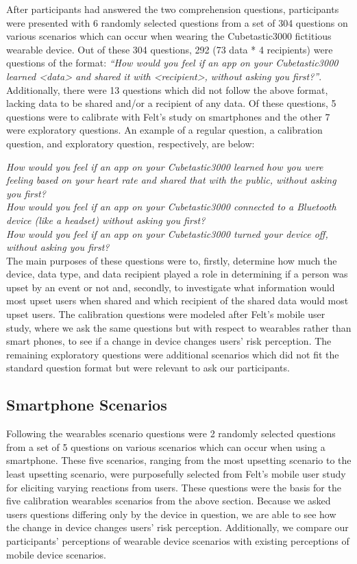 \documentclass{acm_proc_article-sp}
\begin{document}
After participants had answered the two comprehension questions, participants were presented with 6 randomly selected questions from a set of 304 questions on various scenarios which can occur when wearing the Cubetastic3000 fictitious wearable device. Out of these 304 questions, 292 (73 data * 4 recipients) were questions of the format: \textit{``How would you feel if an app on your Cubetastic3000 learned <data> and shared it with <recipient>, without asking you first?''}. Additionally, there were 13 questions which did not follow the above format, lacking data to be shared and/or a recipient of any data. Of these questions, 5 questions were to calibrate with Felt's study on smartphones and the other 7  were exploratory questions. An example of a regular question, a calibration question, and exploratory question, respectively, are below:  

\textit{How would you feel if an app on your Cubetastic3000 learned how you were feeling based on your heart rate and shared that with the public, without asking you first?}\\[-.5cm]

\textit{How would you feel if an app on your Cubetastic3000 connected to a Bluetooth device (like a headset) without asking you first?} \\[-.5cm]

\textit{How would you feel if an app on your Cubetastic3000 turned your device off, without asking you first?}\\[-.5cm]

The main purposes of these questions were to, firstly, determine how much the device, data type, and data recipient played a role in determining if a person was upset by an event or not and, secondly, to investigate what information would most upset users when shared and which recipient of the shared data would most upset users. The calibration questions were modeled after Felt's mobile user study, where we ask the same questions but with respect to wearables rather than smart phones, to see if a change in device changes users' risk perception. The remaining exploratory questions were additional scenarios which did not fit the standard question format but were relevant to ask our participants. 

\subsection{Smartphone Scenarios}
Following the wearables scenario questions were 2 randomly selected questions from a set of 5 questions on various scenarios which can occur when using a smartphone. These five scenarios, ranging from the most upsetting scenario to the least upsetting scenario, were purposefully selected from Felt's mobile user study for eliciting varying reactions from users. These questions were the basis for the five calibration wearables scenarios from the above section. Because we asked users questions differing only by the device in question, we are able to see how the change in device changes users' risk perception. Additionally, we compare our participants' perceptions of wearable device scenarios with existing perceptions of mobile device scenarios.
\end{document}
